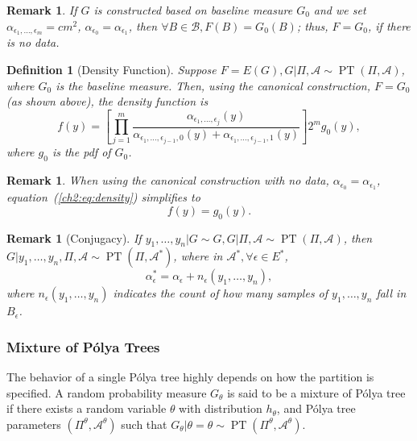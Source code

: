 \documentclass[12pt]{article}
\newtheorem{deff}[thm]{Definition}
\newtheorem{rmk}[thm]{Remark}
\newcommand{\polya}{P\'{o}lya}
\DeclareMathOperator{\pt}{PT}
\begin{document}
\begin{rmk}
  If $G$ is constructed based on baseline measure $G_0$ and we set
  $\alpha_{\epsilon_1, \ldots, \epsilon_m} = cm^2 $,
  $\alpha_{\epsilon_0 }= \alpha_{\epsilon_1}$, then $\forall B \in
  \mathcal{B}, F(B) = G_0(B)$; thus, $F=G_0$, if there is no data.
\end{rmk}

\begin{deff}[Density Function]
  Suppose $F=E(G), G|\Pi, \mathcal{A} \sim \pt (\Pi, \mathcal{A})$,
  where $G_0 $ is the baseline measure. Then, using the canonical
  construction, $F=G_0$ (as shown above), the density function is
  \begin{equation}\label{ch2:eq:density}
    f(y) = \left[ \prod_{j=1}^m \frac{ \alpha_{\epsilon_1, \ldots,
          \epsilon_j}(y)}{\alpha_{\epsilon_1, \ldots, \epsilon_{j-1},0}(y)
        + \alpha_{\epsilon_1, \ldots, \epsilon_{j-1},1}(y)} \right] 2^{m } g_0(y),
  \end{equation}
  where $g_0$ is the pdf of $G_0$.
\end{deff}

\begin{rmk}
  When using the canonical construction with no data,
  $\alpha_{\epsilon_0 } = \alpha_{\epsilon_1}$, equation~(\ref{ch2:eq:density})
  simplifies to
  \begin{displaymath}
    f(y) = g_0(y).
  \end{displaymath}
\end{rmk}

\begin{rmk}[Conjugacy] If $y_1, \ldots, y_n | G \sim G, G|\Pi,
  \mathcal{A} \sim \pt (\Pi, \mathcal{A})$, then $G|y_1, \ldots, y_n,
  \Pi, \mathcal{A} \sim \pt (\Pi, \mathcal{A}^{*})$, where in
  $\mathcal{A}^{*}, \forall \epsilon \in E^{*}$,
  \begin{displaymath}
    \alpha_{\epsilon}^{*} = \alpha_{\epsilon} + n_{\epsilon}(y_1, \ldots, y_n),
  \end{displaymath}
  where $n_{\epsilon}(y_1, \ldots, y_n)$ indicates the count of how many
  samples of $y_1, \ldots, y_n$ fall in $B_{\epsilon}$.
\end{rmk}

\subsubsection{Mixture of \polya{} Trees}
The behavior of a single \polya{} tree highly depends on how the
partition is specified. A random probability measure $G_\theta$ is
said to be a mixture of \polya{} tree if there exists a random
variable $\theta$ with distribution $h_{\theta}$, and \polya{} tree
parameters $(\Pi^{\theta}, \mathcal{A}^{\theta})$ such that
$G_{\theta} | \theta=\theta \sim \pt (\Pi^{\theta},
\mathcal{A}^{\theta})$.
\end{document}
